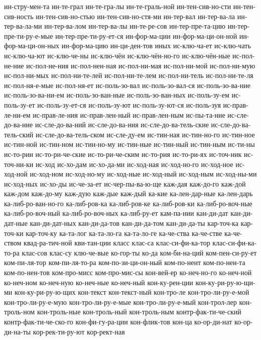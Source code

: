 {ин-стру-мен-та
ин-те-грал
ин-те-гра-лы
ин-те-граль-ной
ин-тен-сив-но-сти
ин-тен-сив-ность
ин-тен-сив-но-стью
ин-тен-сив-но-стя-ми
ин-тер-вал
ин-тер-ва-ла
ин-тер-ва-ла-ми
ин-тер-ва-лом
ин-тер-ва-лы
ин-те-ре-сов
ин-тер-пре-та-цию
ин-тер-пре-ти-ру-е-мые
ин-тер-пре-ти-ру-ет-ся
ин-фор-ма-ции
ин-фор-ма-ци-он-ной
ин-фор-ма-ци-он-ных
ин-фор-ма-цию
ин-ци-ден-тов
иных
ис-клю-ча-ет
ис-клю-чать
ис-клю-ча-ют
ис-клю-че-ны
ис-клю-чён
ис-клю-чён-но-го
ис-клю-чён-ные
ис-пол-не-ние
ис-пол-не-ния
ис-пол-нен-ная
ис-пол-ни-мая
ис-пол-ни-мой
ис-пол-ни-мую
ис-пол-ни-мых
ис-пол-ни-те-лей
ис-пол-ни-те-лем
ис-пол-ни-тель
ис-пол-ни-те-ля
ис-пол-ня-е-мые
ис-пол-ня-ет
ис-поль-зо-вал
ис-поль-зо-вал-ся
ис-поль-зо-ва-ние
ис-поль-зо-ва-ни-ем
ис-поль-зо-ван-ные
ис-поль-зо-ван-ных
ис-поль-зу-ем
ис-поль-зу-ет
ис-поль-зу-ет-ся
ис-поль-зу-ют
ис-поль-зу-ют-ся
ис-поль-зуя
ис-прав-ле-ни-ем
ис-прав-ле-ния
ис-прав-лен-ный
ис-прав-лен-ным
ис-пы-та-ние
ис-сле-до-ва-ние
ис-сле-до-ва-ний
ис-сле-до-ва-ния
ис-сле-до-ва-тель-ские
ис-сле-до-ва-тель-ский
ис-сле-до-ва-тель-ском
ис-сле-ду-ем
ис-тин-ная
ис-тин-но-го
ис-тин-ное
ис-тин-ной
ис-тин-ном
ис-тин-но-му
ис-тин-ные
ис-тин-ный
ис-тин-ным
ис-ти-ны
ис-то-рии
ис-то-ри-че-ские
ис-то-ри-че-ским
ис-то-рия
ис-то-ри-ях
ис-точ-ник
ис-точ-ни-ки
ис-ход
ис-хо-дам
ис-хо-да-ми
ис-ход-ная
ис-ход-но-го
ис-ход-ное
ис-ход-ной
ис-ход-ном
ис-ход-но-му
ис-ход-ные
ис-ход-ный
ис-ход-ным
ис-ход-ны-ми
ис-ход-ных
ис-хо-ды
ис-че-за-ет
ис-чер-пы-ва-ю-ще
каж-дая
каж-до-го
каж-дой
каж-дом
каж-до-му
каж-дую
каж-дые
каж-дый
ка-кие
ка-лен-дар-ные
ка-лен-дарь
ка-либ-ро-ван-но-го
ка-либ-ров-ка
ка-либ-ров-ке
ка-либ-ров-ки
ка-либ-ро-воч-ные
ка-либ-ро-воч-ный
ка-либ-ро-воч-ных
ка-либ-ру-ет
кам-па-нии
кан-ди-дат
кан-ди-дат-ные
кан-ди-дат-ных
кан-ди-да-тов
кан-ди-да-том
кан-ди-да-ты
кар-точ-ка
кар-точ-ки
кар-точ-ку
ка-та-лог
ка-та-ло-га
ка-та-ло-ге
ка-че-ства
ка-че-стве
ка-че-ством
квад-ра-тич-ной
кви-тан-ции
класс
клас-са
клас-си-фи-ка-тор
клас-си-фи-ка-то-ра
клас-сов
клас-су
клю-че-вые
ко-гор-ты
ко-да
ком-би-на-ций
ком-пен-си-ру-ет
ком-пи-ля-тор
ком-пи-ля-то-ра
ком-по-зи-ци-он-ный
ком-по-нент
ком-по-нен-та
ком-по-нен-тов
ком-про-мисс
ком-про-мис-сы
кон-вей-ер
ко-неч-но-го
ко-неч-ной
ко-неч-ном
ко-неч-ную
ко-неч-ные
ко-неч-ный
кон-ку-рен-ции
кон-ку-ри-ру-ю-щи-ми
кон-ку-ри-ру-ю-щих
кон-текст
кон-текст-ный
кон-тро-ле
кон-тро-ли-ру-е-мой
кон-тро-ли-ру-е-мую
кон-тро-ли-ру-е-мые
кон-тро-ли-ру-е-мый
кон-трол-лер
кон-троль-ном
кон-троль-ные
кон-троль-ный
кон-троль-ным
контр-фак-ти-че-ский
контр-фак-ти-че-ско-го
кон-фи-гу-ра-ции
кон-флик-тов
кон-ца
ко-ор-ди-нат
ко-ор-ди-на-ты
кор-рек-ти-ру-ют
кор-рект-ная
}
